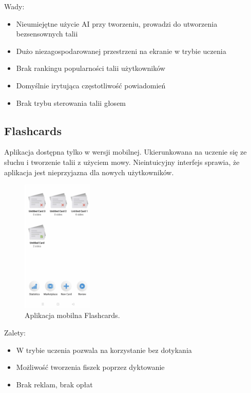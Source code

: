 Wady:
\begin{itemize}
    \item Nieumiejętne użycie AI przy tworzeniu, prowadzi do utworzenia bezsensownych talii
    \item Dużo niezagospodarowanej przestrzeni na ekranie w trybie uczenia
    \item Brak rankingu popularności talii użytkowników
    \item Domyślnie irytująca częstotliwość powiadomień
    \item Brak trybu sterowania talii głosem
\end{itemize}

\subsection{Flashcards}

Aplikacja dostępna tylko w wersji mobilnej. Ukierunkowana na uczenie się ze słuchu i tworzenie talii z użyciem mowy. Nieintuicyjny interfejs sprawia, że aplikacja jest nieprzyjazna dla nowych użytkowników.

\begin{figure}[H]
    \centering
    \includegraphics[width=0.3\textwidth]{chapters/chapter_3/flashcards.png}
    \caption{Aplikacja mobilna Flashcards.}
    \label{img:flashcards}
\end{figure}

Zalety:
\begin{itemize}
    \item W trybie uczenia pozwala na korzystanie bez dotykania
    \item Możliwość tworzenia fiszek poprzez dyktowanie
    \item Brak reklam, brak opłat
\end{itemize}

